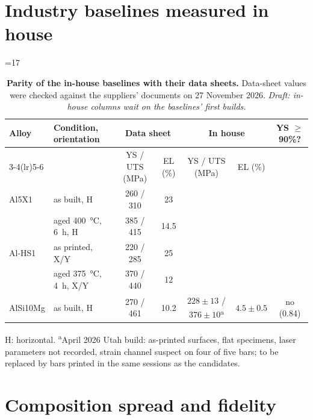 \documentclass[11pt]{article}
\newcommand{\checksec}[1]{\ifnum\value{section}=#1\relax\else
  \PackageError{SI}{Section numbering drifted: this section must be S#1}{The
  manuscript and figure-plan.md cite SI sections by number.}\fi}
\begin{document}
\section{Industry baselines measured in house}
\checksec{17}\label{sec:Sbaselines}

\begin{table}[h]
\centering
\caption{\textbf{Parity of the in-house baselines with their data sheets.} Data-sheet
values were checked against the suppliers' documents on 27 November 2026.
\ifdraft\textit{Draft: in-house columns wait on the baselines' first builds.}\fi}
\label{tab:Sparity}
\footnotesize
\setlength{\tabcolsep}{3.5pt}
\begin{tabular}{@{}llccccc@{}}
\toprule
Alloy & Condition, orientation & \multicolumn{2}{c}{Data sheet} & \multicolumn{2}{c}{In house} & YS $\ge$90\%?\\
\cmidrule(lr){3-4}\cmidrule(lr){5-6}
 & & YS / UTS (MPa) & EL (\%) & YS / UTS (MPa) & EL (\%) & \\
\midrule
Al5X1\cite{ds_al5x1} & as built, H & 260 / 310 & 23 & \tbd{} & \tbd{} & \tbd{}\\
 & aged \SI{400}{\celsius}, \SI{6}{\hour}, H & 385 / 415 & 14.5 & \tbd{} & \tbd{} & \tbd{}\\
Al-HS1\cite{ds_hoganas} & as printed, X/Y & 220 / 285 & 25 & \tbd{} & \tbd{} & \tbd{}\\
 & aged \SI{375}{\celsius}, \SI{4}{\hour}, X/Y & 370 / 440 & 12 & \tbd{} & \tbd{} & \tbd{}\\
AlSi10Mg\cite{ds_eos} & as built, H & 270 / 461 & 10.2 & $228\pm13$ / $376\pm10$\textsuperscript{a} & $4.5\pm0.5$ & no (0.84)\\
\bottomrule
\end{tabular}

\smallskip
\raggedright\footnotesize H: horizontal. \textsuperscript{a}April 2026 Utah build: as-printed surfaces,
flat specimens, laser parameters not recorded, strain channel suspect on four of
five bars; to be replaced by bars printed in the same sessions as the candidates.
\end{table}

\section{Composition spread and fidelity}
\label{sec:Scomposition}

\printbibliography
\end{document}
